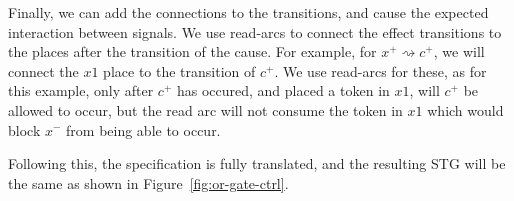 \documentclass[british,conference,compsoc]{IEEEtran}
\newcommand{\noun}[1]{\textsc{#1}}
\begin{document}
Finally, we can add the connections to the transitions, and cause the 
expected interaction between signals. We use read-arcs to connect the effect
transitions to the places after the transition of the cause. For example, for
$x^{+} \rightsquigarrow c^{+}$, we will connect the $x1$ place to the 
transition of $c^{+}$. We use read-arcs for these, as for this example, only
after $c^{+}$ has occured, and placed a token in $x1$, will $c^{+}$ be allowed
to occur, but the read arc will not consume the token in $x1$ which would block
$x^{-}$ from being able to occur. 

Following this, the specification is fully translated, and the resulting STG will
be the same as shown in Figure~\ref{fig:or-gate-ctrl}.

\end{document}
